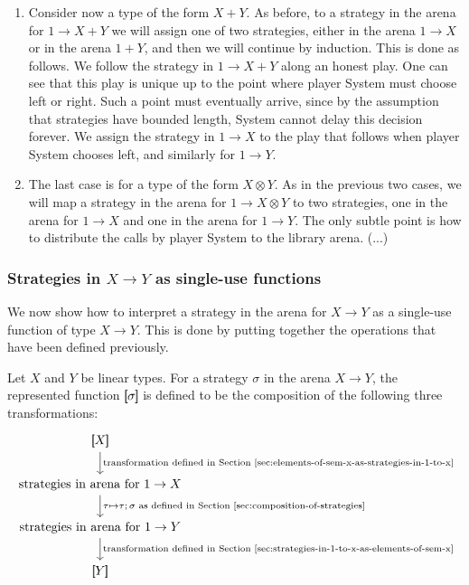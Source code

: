 \begin{enumerate}
    \item Consider now a type of the form $X + Y$. As before, to a strategy in the arena for $1 \to X+ Y$  we will assign one of two strategies, either in the arena $1 \to X$ or in the arena $1 + Y$, and then we will continue by induction. This is done as follows. We follow the strategy in $1 \to X+Y$ along an honest play. One can see that this play is unique up to the point where player System must choose left or right. Such a point must eventually arrive, since by the assumption that strategies have bounded length, System cannot delay this decision forever.  We assign the strategy in $1 \to X$ to the play that follows when player System chooses left, and similarly for $1 \to Y$. 

    \item The last case is for a type of the form $X \otimes Y$. As in the previous two cases, we will map a strategy in the arena for $1 \to X \otimes Y$ to two strategies, one in the arena for $1 \to X$ and one in the arena for $1 \to Y$. The only subtle point is how to distribute the calls by player System to the library arena. (...)
\end{enumerate}







\subsubsection{Strategies in $X \to Y$ as single-use functions}
We now show how to interpret a strategy in the arena for $X \to Y$ as a single-use function of type $X \to Y$. This is done by putting together the operations that have been defined previously. 

\begin{definition}\label{def:strategy-as-single-use-function}
    Let $X$ and $Y$ be linear types. For a strategy $\sigma$ in the arena $X \to Y$, the represented function  $[\!\![\sigma]\!\!]$ is defined to be the composition of the following three transformations:
    \[
    \begin{tikzcd}
    \sem X  
    \ar[d,"{\text{transformation defined in Section~\ref{sec:elements-of-sem-x-as-strategies-in-1-to-x}}}"] 
     \\ 
    \text{strategies in arena for $1 \to X$}
    \ar[d,"{\tau \mapsto \text{$\tau;\sigma$ as defined in Section~\ref{sec:composition-of-strategies}}}"] 
    \\
    \text{strategies in arena for $1 \to Y$}
    \ar[d,"{\text{transformation defined in Section~\ref{sec:strategies-in-1-to-x-as-elements-of-sem-x}}}"] 
    \\ 
    \sem Y
    \end{tikzcd}
    \]
\end{definition}

